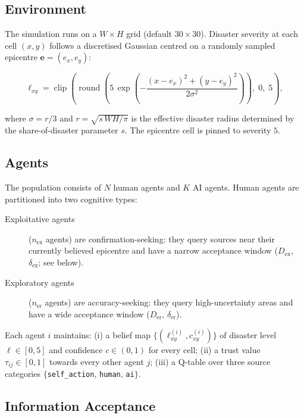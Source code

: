 \documentclass[pdflatex,sn-apa]{sn-jnl}%
\begin{document}
\subsection{Environment}

The simulation runs on a $W \times H$ grid (default $30 \times 30$).
Disaster severity at each cell $(x,y)$ follows a discretised Gaussian
centred on a randomly sampled epicentre $\mathbf{e}=(e_x,e_y)$:

\begin{equation}
  \ell_{xy} = \operatorname{clip}\!\left(
    \operatorname{round}\!\left(
      5\,\exp\!\left(-\frac{(x-e_x)^2+(y-e_y)^2}{2\sigma^2}\right)
    \right),\; 0,\; 5
  \right),
  \label{eq:disaster}
\end{equation}

where $\sigma = r/3$ and $r = \sqrt{s\,WH/\pi}$ is the effective
disaster radius determined by the share-of-disaster parameter $s$.
The epicentre cell is pinned to severity $5$.

\subsection{Agents}

The population consists of $N$ human agents and $K$ AI agents.
Human agents are partitioned into two cognitive types:

\begin{description}
  \item[Exploitative agents] ($n_\mathrm{ex}$ agents) are
    confirmation-seeking: they query sources near their currently
    believed epicentre and have a narrow acceptance window
    ($D_\mathrm{ex}$, $\delta_\mathrm{ex}$; see below).
  \item[Exploratory agents] ($n_\mathrm{er}$ agents) are
    accuracy-seeking: they query high-uncertainty areas and have a
    wide acceptance window ($D_\mathrm{er}$, $\delta_\mathrm{er}$).
\end{description}

Each agent $i$ maintains:
(i) a belief map $\{(\ell_{xy}^{(i)}, c_{xy}^{(i)})\}$ of disaster
level $\ell\in[0,5]$ and confidence $c\in(0,1)$ for every cell;
(ii) a trust value $\tau_{ij}\in[0,1]$ towards every other agent $j$;
(iii) a Q-table over three source categories
$\{$\texttt{self\_action}, \texttt{human}, \texttt{ai}$\}$.

\subsection{Information Acceptance}
\end{document}
